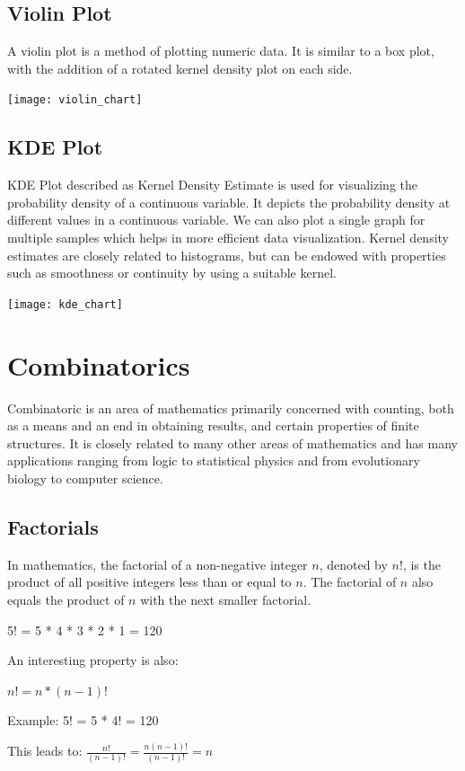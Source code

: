 \documentclass{article}
\begin{document}
\subsection{Violin Plot}
A violin plot is a method of plotting numeric data. It is similar to a box plot, with the addition of a rotated kernel density plot on each side.

\texttt{[image: violin\_chart]}

\subsection{KDE Plot}

KDE Plot described as Kernel Density Estimate is used for visualizing the probability density of a continuous variable. It depicts the probability density at different values in a continuous variable. We can also plot a single graph for multiple samples which helps in more efficient data visualization.
Kernel density estimates are closely related to histograms, but can be endowed with properties such as smoothness or continuity by using a suitable kernel.

\texttt{[image: kde\_chart]}
\clearpage

\section{Combinatorics}
Combinatoric is an area of mathematics primarily concerned with counting, both as a means and an end in obtaining results, and certain properties of finite structures. It is closely related to many other areas of mathematics and has many applications ranging from logic to statistical physics and from evolutionary biology to computer science.

\subsection{Factorials}
In mathematics, the factorial of a non-negative integer $n$, denoted by $n!$, is the product of all positive integers less than or equal to $n$. The factorial of $n$ also equals the product of $n$ with the next smaller factorial.

5! = 5 * 4 * 3 * 2 * 1 = 120

An interesting property is also:

$n! = n * (n-1)!$

Example:
5! = 5 * 4! = 120

This leads to:
$\frac{n!}{(n-1)!} = \frac{n(n-1)!}{(n-1)!} = n$
\end{document}
